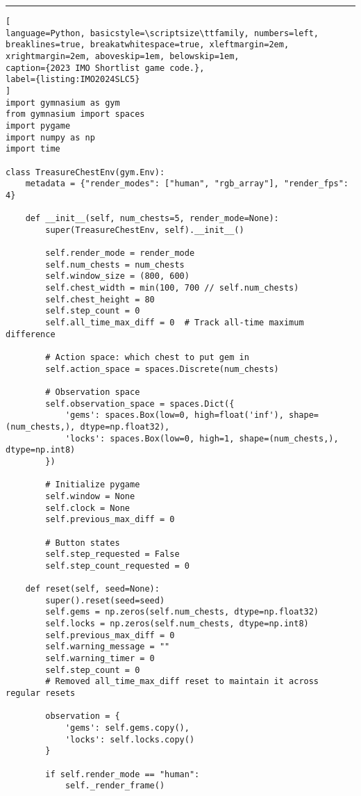 \hrule
\begin{lstlisting}[
language=Python, basicstyle=\scriptsize\ttfamily, numbers=left, breaklines=true, breakatwhitespace=true, xleftmargin=2em, xrightmargin=2em, aboveskip=1em, belowskip=1em,
caption={2023 IMO Shortlist game code.},
label={listing:IMO2024SLC5}
]
import gymnasium as gym
from gymnasium import spaces
import pygame
import numpy as np
import time

class TreasureChestEnv(gym.Env):
    metadata = {"render_modes": ["human", "rgb_array"], "render_fps": 4}

    def __init__(self, num_chests=5, render_mode=None):
        super(TreasureChestEnv, self).__init__()
        
        self.render_mode = render_mode
        self.num_chests = num_chests
        self.window_size = (800, 600)
        self.chest_width = min(100, 700 // self.num_chests)
        self.chest_height = 80
        self.step_count = 0
        self.all_time_max_diff = 0  # Track all-time maximum difference
        
        # Action space: which chest to put gem in
        self.action_space = spaces.Discrete(num_chests)
        
        # Observation space
        self.observation_space = spaces.Dict({
            'gems': spaces.Box(low=0, high=float('inf'), shape=(num_chests,), dtype=np.float32),
            'locks': spaces.Box(low=0, high=1, shape=(num_chests,), dtype=np.int8)
        })

        # Initialize pygame
        self.window = None
        self.clock = None
        self.previous_max_diff = 0
        
        # Button states
        self.step_requested = False
        self.step_count_requested = 0
        
    def reset(self, seed=None):
        super().reset(seed=seed)
        self.gems = np.zeros(self.num_chests, dtype=np.float32)
        self.locks = np.zeros(self.num_chests, dtype=np.int8)
        self.previous_max_diff = 0
        self.warning_message = ""
        self.warning_timer = 0
        self.step_count = 0
        # Removed all_time_max_diff reset to maintain it across regular resets
        
        observation = {
            'gems': self.gems.copy(),
            'locks': self.locks.copy()
        }
        
        if self.render_mode == "human":
            self._render_frame()
            

\end{lstlisting}
